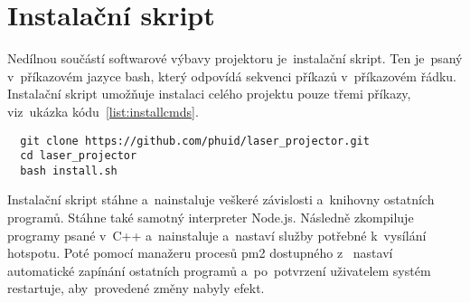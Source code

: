 





\section{Instalační skript}
Nedílnou součástí softwarové výbavy projektoru je~instalační skript.
Ten je~psaný v~příkazovém jazyce bash, který odpovídá sekvenci příkazů v~příkazovém řádku.
Instalační skript umožňuje instalaci celého projektu pouze třemi příkazy, viz~ukázka kódu~\ref{list:installcmds}.

\begin{code}
\begin{verbatim}
  git clone https://github.com/phuid/laser_projector.git
  cd laser_projector
  bash install.sh
\end{verbatim}
\end{code}

Instalační skript stáhne a~nainstaluje veškeré závislosti a~knihovny ostatních programů. Stáhne také samotný interpreter Node.js.
Následně zkompiluje programy psané v~C++ a~nainstaluje a~nastaví služby potřebné k~vysílání hotspotu. Poté pomocí manažeru procesů pm2 dostupného z~\cite{pm2} nastaví automatické zapínání ostatních programů a~po~potvrzení uživatelem systém restartuje, aby~provedené změny nabyly efekt.
